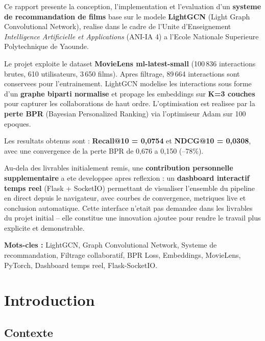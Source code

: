 \documentclass[12pt,a4paper]{report}
\begin{document}
Ce rapport presente la conception, l'implementation et l'evaluation d'un
\textbf{systeme de recommandation de films} base sur le modele
\textbf{LightGCN} (Light Graph Convolutional Network), realise dans le
cadre de l'Unite d'Enseignement \textit{Intelligence Artificielle et
Applications} (ANI-IA 4) a l'Ecole Nationale Superieure Polytechnique
de Yaounde.

Le projet exploite le dataset \textbf{MovieLens ml-latest-small}
(100\,836 interactions brutes, 610 utilisateurs, 3\,650 films).
Apres filtrage, 89\,664 interactions sont conservees pour
l'entrainement. LightGCN modelise les interactions sous forme d'un
\textbf{graphe biparti normalise} et propage les embeddings sur
\textbf{K=3 couches} pour capturer les collaborations de haut ordre.
L'optimisation est realisee par la \textbf{perte BPR} (Bayesian
Personalized Ranking) via l'optimiseur Adam sur 100 epoques.

Les resultats obtenus sont :
\textbf{Recall@10 = 0,0754} et \textbf{NDCG@10 = 0,0308},
avec une convergence de la perte BPR de 0,676 a 0,150 (--78\%).

Au-dela des livrables initialement remis, une
\textbf{contribution personnelle supplementaire} a ete
developpee apres reflexion : un \textbf{dashboard interactif
temps reel} (Flask + SocketIO) permettant de visualiser
l'ensemble du pipeline en direct depuis le navigateur,
avec courbes de convergence, metriques live et conclusion
automatique. Cette interface n'etait pas demandee dans les
livrables du projet initial -- elle constitue une innovation
ajoutee pour rendre le travail plus explicite et demonstrable.

\bigskip
\noindent\textbf{Mots-cles :} LightGCN, Graph Convolutional Network,
Systeme de recommandation, Filtrage collaboratif, BPR Loss,
Embeddings, MovieLens, PyTorch, Dashboard temps reel, Flask-SocketIO.

\tableofcontents
\listoffigures
\listoftables
\newpage

\chapter{Introduction}

\section{Contexte}
\end{document}
